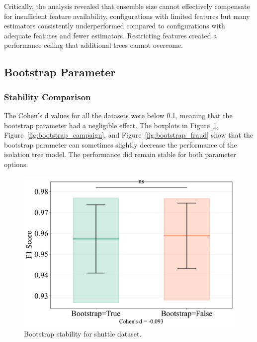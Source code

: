 \documentclass[10pt, conference]{IEEEtran}
\begin{document}
Critically, the analysis revealed that ensemble size cannot effectively compensate for insufficient feature availability, configurations with limited features but many estimators consistently underperformed compared to configurations with adequate features and fewer estimators. Restricting features created a performance ceiling that additional trees cannot overcome.


\subsection{Bootstrap Parameter}
\subsubsection{Stability Comparison}

The Cohen's d values for all the datasets were below 0.1, meaning that the bootstrap parameter had a negligible effect. The boxplots in Figure~\ref{fig:bootstrap_shuttle}, Figure~\ref{fig:bootstrap_campaign}, and Figure~\ref{fig:bootstrap_fraud} show that the bootstrap parameter can sometimes slightly decrease the performance of the isolation tree model. The performance did remain stable for both parameter options.

\begin{figure}[H]
	\centering
	\includegraphics[width=0.95\linewidth]{../results/shuttle/bootstrap/bootstrap_stability_box.pdf}
	\caption{Bootstrap stability for shuttle dataset.}
	\label{fig:bootstrap_shuttle}
\end{figure}
\end{document}

